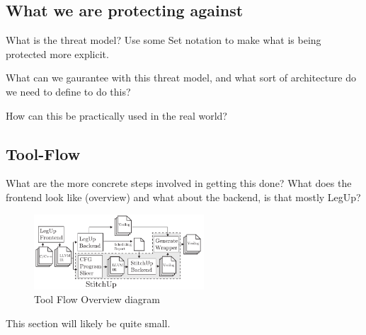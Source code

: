 
\subsection{What we are protecting against}
What is the threat model?
Use some Set notation to make what is being protected more explicit.

What can we gaurantee with this threat model, and what sort of architecture
do we need to define to do this?

How can this be practically used in the real world?

\subsection{Tool-Flow}

What are the more concrete steps involved in getting this done?
What does the frontend look like (overview) and what about the backend,
is that mostly LegUp?

\begin{figure}[!t]
\centering
\includegraphics[width=2.5in]{./imgs/tool-flow.pdf}
\caption{Tool Flow Overview diagram}
\label{fig:tool_flow_diagram}
\end{figure}

This section will likely be quite small.
